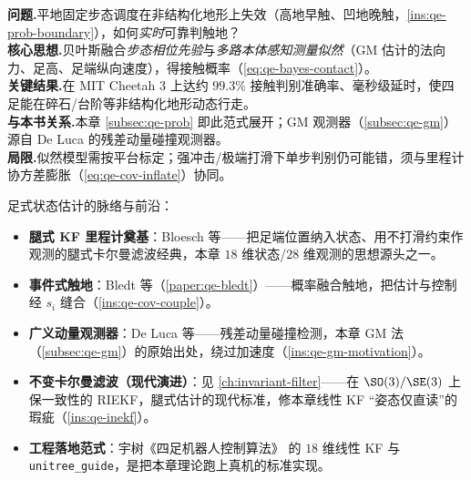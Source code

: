 \begin{paper}\label{paper:qe-bledt}
\textbf{问题.}\;平地固定步态调度在非结构化地形上失效（高地早触、凹地晚触，\cref{ins:qe-prob-boundary}），如何\emph{实时}可靠判触地？\\
\textbf{核心思想.}\;贝叶斯融合\emph{步态相位先验}与\emph{多路本体感知测量似然}（GM 估计的法向力、足高、足端纵向速度），得接触概率（\cref{eq:qe-bayes-contact}）。\\
\textbf{关键结果.}\;在 MIT Cheetah 3\cite{bledt2018cheetah3} 上达约 $99.3\%$ 接触判别准确率、毫秒级延时，使四足能在碎石/台阶等非结构化地形动态行走。\\
\textbf{与本书关系.}\;本章 \cref{subsec:qe-prob} 即此范式展开；GM 观测器（\cref{subsec:qe-gm}）源自 De Luca\cite{deluca2006collision} 的残差动量碰撞观测器。\\
\textbf{局限.}\;似然模型需按平台标定；强冲击/极端打滑下单步判别仍可能错，须与里程计协方差膨胀（\cref{eq:qe-cov-inflate}）协同。
\end{paper}

\noindent 足式状态估计的脉络与前沿：
\begin{itemize}
  \item \textbf{腿式 KF 里程计奠基}：Bloesch 等\cite{bloesch2013state}——把足端位置纳入状态、用不打滑约束作观测的腿式卡尔曼滤波经典，本章 $18$ 维状态/$28$ 维观测的思想源头之一。
  \item \textbf{事件式触地}：Bledt 等\cite{bledt2018contact}（\cref{paper:qe-bledt}）——概率融合触地，把估计与控制经 $s_i$ 缝合（\cref{ins:qe-cov-couple}）。
  \item \textbf{广义动量观测器}：De Luca 等\cite{deluca2006collision}——残差动量碰撞检测，本章 GM 法（\cref{subsec:qe-gm}）的原始出处，绕过加速度（\cref{ins:qe-gm-motivation}）。
  \item \textbf{不变卡尔曼滤波（现代演进）}：见 \cref{ch:invariant-filter}——在 $\SO(3)/\SE(3)$ 上保一致性的 RIEKF，腿式估计的现代标准，修本章线性 KF “姿态仅直读”的瑕疵（\cref{ins:qe-inekf}）。
  \item \textbf{工程落地范式}：宇树《四足机器人控制算法》\cite{unitree2023quadruped} 的 $18$ 维线性 KF 与 \texttt{unitree\_guide}，是把本章理论跑上真机的标准实现。
\end{itemize}

